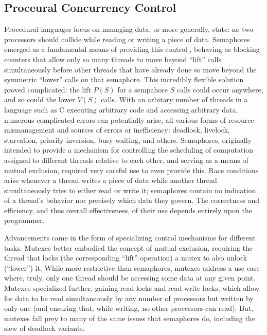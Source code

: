 \subsection{Proceural Concurrency Control}
Procedural languages focus on managing data, or more generally, state: no two
processors should collide while reading or writing a piece of data. Semaphores
emerged as a fundamental means of providing this control \cite{semaphore},
behaving as blocking counters that allow only so many threads to move beyond
``lift'' calls simultaneously before other threads that have already done so
move beyond the symmetric ``lower'' calls on that semaphore. This incredibly
flexible solution proved complicated: the lift $P(S)$ for a sempahore $S$ calls
could occur anywhere, and so could the lower $V(S)$ calls. With an arbitary
number of threads in a language such as C executing arbitrary code and accessing
arbitrary data, numerous complicated errors can potentially arise, all various
forms of resource mismanagement and sources of errors or inefficiency: deadlock,
livelock, starvation, priority inversion, busy waiting, and others. Semaphores,
originally intended to provide a mechanism for controlling the scheduling of
computation assigned to different threads relative to each other, and serving as
a means of mutual exclusion, required very careful use to even provide this.
Race conditions arise whenever a thread writes a piece of data while another
thread simultaneously tries to either read or write it; semaphores contain no
indication of a thread's behavior nor precisely which data they govern. The
correctness and efficiency, and thus overall effectiveness, of their use depends
entirely upon the programmer.

Advancements came in the form of specializing control mechanisms for different
tasks. Mutexes better embodied the concept of mutual exclusion, requiring the
thread that locks (the corresponding ``lift'' operation) a mutex to also unlock
(``lower'') it. While more restrictive than semaphores, mutexes address a use
case where, truly, only one thread should be accessing some data at any given
point. Mutexes specialized further, gaining read-locks and read-write locks,
which allow for data to be read simultaneously by any number of processors but
written by only one (and ensuring that, while writing, no other processors can
read). But, mutexes fall prey to many of the same issues that semaphores do,
including the slew of deadlock variants.

